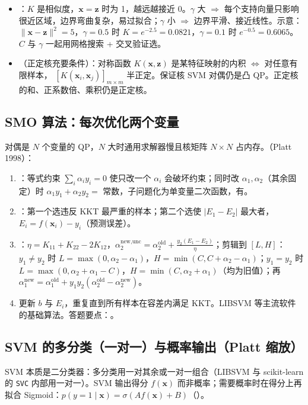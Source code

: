 \begin{itemize}
\item {}：$K$ 是相似度，$\bm x=\bm z$ 时为 1，越远越接近 0。$\gamma$ 大 $\Rightarrow$ 每个支持向量只影响很近区域，边界弯曲复杂，易过拟合；$\gamma$ 小 $\Rightarrow$ 边界平滑、接近线性。示意：$\|\bm x-\bm z\|^2=5$，$\gamma=0.5$ 时 $K=e^{-2.5}=0.0821$，$\gamma=0.1$ 时 $e^{-0.5}=0.6065$。$C$ 与 $\gamma$ 一起用网格搜索 + 交叉验证选。
\item {}（正定核充要条件）：对称函数 $K(\bm x,\bm z)$ 是某特征映射的内积 $\iff$ 对任意有限样本， $[K(\bm x_i,\bm x_j)]_{m\times m}$ 半正定。保证核 SVM 对偶仍是凸 QP。正定核的和、正系数倍、乘积仍是正定核。
\end{itemize}

\subsection{SMO 算法：每次优化两个变量 \tagext}
对偶是 $N$ 个变量的 QP，$N$ 大时通用求解器慢且核矩阵 $N\times N$ 占内存。（Platt 1998）：
\begin{enumerate}
\item {}：等式约束 $\sum_i\alpha_iy_i=0$ 使只改一个 $\alpha_i$ 会破坏约束；同时改 $\alpha_1,\alpha_2$（其余固定）时 $\alpha_1y_1+\alpha_2y_2=$ 常数，子问题化为单变量二次函数，有。
\item {}：第一个选违反 KKT 最严重的样本；第二个选使 $|E_1-E_2|$ 最大者，$E_i=f(\bm x_i)-y_i$（预测误差）。
\item {}：$\eta=K_{11}+K_{22}-2K_{12}$，$\alpha_2^{\text{new,unc}}=\alpha_2^{\text{old}}+\frac{y_2(E_1-E_2)}{\eta}$；剪辑到 $[L,H]$：$y_1\neq y_2$ 时 $L=\max(0,\alpha_2-\alpha_1)$，$H=\min(C,C+\alpha_2-\alpha_1)$；$y_1=y_2$ 时 $L=\max(0,\alpha_2+\alpha_1-C)$，$H=\min(C,\alpha_2+\alpha_1)$（均为旧值）；再 $\alpha_1^{\text{new}}=\alpha_1^{\text{old}}+y_1y_2(\alpha_2^{\text{old}}-\alpha_2^{\text{new}})$。
\item 更新 $b$ 与 $E_i$，重复直到所有样本在容差内满足 KKT。LIBSVM 等主流软件的基础算法。答题要点：。
\end{enumerate}

\subsection{SVM 的多分类（一对一）与概率输出（Platt 缩放）\tagext}
SVM 本质是二分类器：多分类用一对其余或一对一组合（LIBSVM 与 scikit-learn 的 \texttt{SVC} 内部用一对一）。SVM 输出得分 $f(\bm x)$ 而非概率；需要概率时在得分上再拟合 Sigmoid：$p(y=1\mid\bm x)=\sigma(Af(\bm x)+B)$（）。

